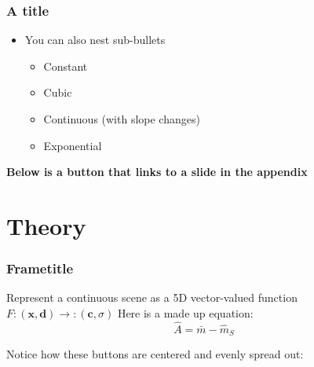\documentclass[
    11pt, 
    aspectratio=169, 
]{beamer}
\begin{document}
\begin{frame}
\label{Test} %
	\frametitle{A title}

        \begin{itemize}
            \item You can also nest sub-bullets
            \begin{itemize}
                \item Constant
                \item Cubic
                \item Continuous (with slope changes)
                \item Exponential \newline
            \end{itemize}
        \end{itemize}

        \textbf{Below is a button that links to a slide in the appendix}
        
        \begin{center}
            \hyperlink{Figure}{}    
        \end{center}
\end{frame}

\section{Theory}

\begin{frame}
\label{NeRF Def}
	\frametitle{Frametitle}
	Represent a continuous scene as a 5D vector-valued function $F : (\mathbf{x}, \mathbf{d}) \rightarrow : (\mathbf{c}, \sigma)$ 	
        Here is a made up equation:
        $$ \hat{A} = \bar{m}-\hat{m}_S$$ \newline

        Notice how these buttons are centered and evenly spread out:\newline

        \begin{columns}[t] %
		\begin{column}{0.25\textwidth} %
                \hyperlink{Terms}{}
		\end{column}
  		\begin{column}{0.25\textwidth} %
                \hyperlink{Definitions}{}
		\end{column}
            \begin{column}{0.25\textwidth} %
                \hyperlink{Theorems}{}
		\end{column}
	\end{columns}
        
\end{frame}
\end{document}
